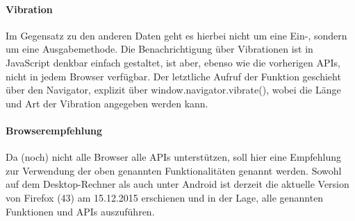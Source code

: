 \documentclass[a4paper]{spie}  %
\begin{document}
\begin{figure}[h]
\end{figure}




\paragraph{Vibration}
Im Gegensatz zu den anderen Daten geht es hierbei nicht um eine Ein-, sondern um eine Ausgabemethode. Die Benachrichtigung über Vibrationen ist in JavaScript denkbar einfach gestaltet, ist aber, ebenso wie die vorherigen APIs, nicht in jedem Browser verfügbar. Der letztliche Aufruf der Funktion geschieht über den Navigator, explizit über window.navigator.vibrate(), wobei die Länge und Art der Vibration angegeben werden kann.

\paragraph{Browserempfehlung}
Da (noch) nicht alle Browser alle APIs unterstützen, soll hier eine Empfehlung zur Verwendung der oben genannten Funktionalitäten genannt werden. Sowohl auf dem Desktop-Rechner als auch unter Android ist derzeit die aktuelle Version von Firefox (43) am 15.12.2015 erschienen und in der Lage, alle genannten Funktionen und APIs auszuführen.
\end{document}
